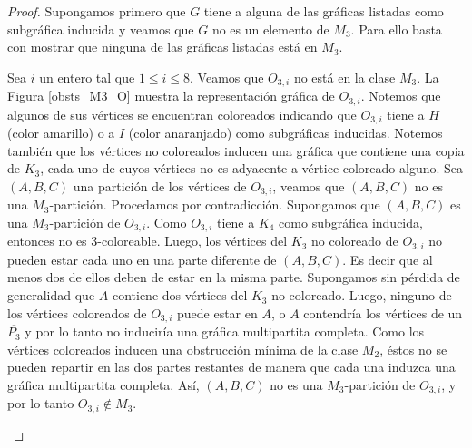 \begin{proof}
Supongamos primero que $G$ tiene a alguna de las gráficas listadas como subgráfica inducida y veamos que $G$ no es un elemento de $M_3$. Para ello basta con mostrar que ninguna de las gráficas listadas está en $M_3$.

Sea $i$ un entero tal que $1\le i \le 8$. Veamos que $O_{3,i}$ no está en la clase $M_3$. La Figura \ref{obsts_M3_O} muestra la representación gráfica de $O_{3,i}$. Notemos que algunos de sus vértices se encuentran coloreados indicando que $O_{3,i}$ tiene a $H$ (color amarillo) o a $I$ (color anaranjado) como subgráficas inducidas. Notemos también que los vértices no coloreados inducen una gráfica que contiene una copia de $K_3$, cada uno de cuyos vértices no es adyacente a vértice coloreado alguno. Sea $(A,B,C)$ una partición de los vértices de $O_{3,i}$, veamos que $(A,B,C)$ no es una $M_3$-partición. Procedamos por contradicción. Supongamos que $(A,B,C)$ es una $M_3$-partición de $O_{3,i}$. Como $O_{3,i}$ tiene a $K_4$ como subgráfica inducida, entonces no es 3-coloreable. Luego, los vértices del $K_3$ no coloreado de $O_{3,i}$ no pueden estar cada uno en una parte diferente de $(A,B,C)$. Es decir que al menos dos de ellos deben de estar en la misma parte. Supongamos sin pérdida de generalidad que $A$ contiene dos vértices del $K_3$ no coloreado. Luego, ninguno de los vértices coloreados de $O_{3,i}$ puede estar en $A$, o $A$ contendría los vértices de un $\overline{P_3}$ y por lo tanto no induciría una gráfica multipartita completa. Como los vértices coloreados inducen una obstrucción mínima de la clase $M_2$, éstos no se pueden repartir en las dos partes
restantes de manera que cada una induzca una gráfica multipartita completa. Así, $(A,B,C)$ no es una $M_3$-partición de $O_{3,i}$, y por lo tanto $O_{3,i}\notin M_3$.

\begin{figure}[ht!]
\begin{subfigure}{\textwidth}
\begin{center}
\end{center}
\end{subfigure}
\end{figure}
\end{proof}
